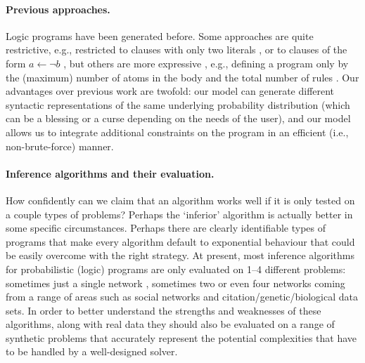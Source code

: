 \documentclass{article}
\begin{document}
\paragraph{Previous approaches.} Logic programs have been generated before. Some
approaches are quite restrictive, e.g., restricted to clauses with only two
literals \cite{DBLP:conf/lpnmr/NamasivayamT09}, or to clauses of the form $a
\gets \neg b$ \cite{DBLP:journals/tocl/WenWSL16}, but others are more
expressive \cite{DBLP:journals/tplp/WangWM15}, e.g., defining a program only by
the (maximum) number of atoms in the body and the total number of rules
\cite{DBLP:conf/iclp/ZhaoL03,zhao2004answer}. Our advantages over previous work
are twofold: our model can generate different syntactic representations of the
same underlying probability distribution (which can be a blessing or a curse
depending on the needs of the user), and our model allows us to integrate
additional constraints on the program in an efficient (i.e., non-brute-force)
manner.

\paragraph{Inference algorithms and their evaluation.} How confidently can we
claim that an algorithm works well if it is only tested on a couple types of
problems? Perhaps the `inferior' algorithm is actually better in some specific
circumstances. Perhaps there are clearly identifiable types of programs that
make every algorithm default to exponential behaviour that could be easily
overcome with the right strategy. At present, most inference algorithms for
probabilistic (logic) programs are only evaluated on 1--4 different problems:
sometimes just a single network
\cite{DBLP:journals/tplp/KimmigDRCR11,DBLP:journals/corr/abs-1112-3785,DBLP:conf/iclp/KimmigCRDR08},
sometimes two
\cite{DBLP:journals/corr/abs-1009-3798,DBLP:conf/ecai/BruynoogheMKGVJR10} or
even four networks \cite{DBLP:conf/ijcai/VlasselaerBKMR15} coming from a range
of areas such as social networks and citation/genetic/biological data sets. In
order to better understand the strengths and weaknesses of these algorithms,
along with real data they should also be evaluated on a range of synthetic
problems that accurately represent the potential complexities that have to be
handled by a well-designed solver.
\end{document}
